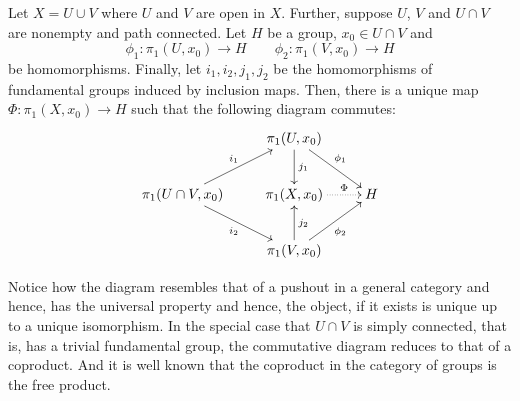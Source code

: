 \begin{theorem}
    Let $X = U\cup V$ where $U$ and $V$ are open in $X$. Further, suppose $U$, $V$ and $U\cap V$ are nonempty and path connected. Let $H$ be a group, $x_0\in U\cap V$ and 
    \begin{equation*}
        \phi_1:\pi_1(U,x_0)\to H\qquad\phi_2:\pi_1(V, x_0)\to H
    \end{equation*}
    be homomorphisms. Finally, let $i_1,i_2,j_1,j_2$ be the homomorphisms of fundamental groups induced by inclusion maps. Then, there is a unique map $\Phi:\pi_1(X,x_0)\to H$ such that the following diagram commutes:
    \begin{equation*}
        \xymatrix {
            & \pi_1(U,x_0)\ar[d]^{j_1}\ar[rd]^{\phi_1}\\
            \pi_1(U\cap V, x_0)\ar[ru]^{i_1}\ar[rd]_{i_2} & \pi_1(X,x_0)\ar@{.>}[r]^-{\Phi} & H\\
            & \pi_1(V,x_0)\ar[ru]_{\phi_2}\ar[u]_{j_2}
        }
    \end{equation*}
\end{theorem}

Notice how the diagram resembles that of a pushout in a general category and hence, has the universal property and hence, the object, if it exists is unique up to a unique isomorphism. In the special case that $U\cap V$ is simply connected, that is, has a trivial fundamental group, the commutative diagram reduces to that of a coproduct. And it is well known that the coproduct in the category of groups is the free product.

